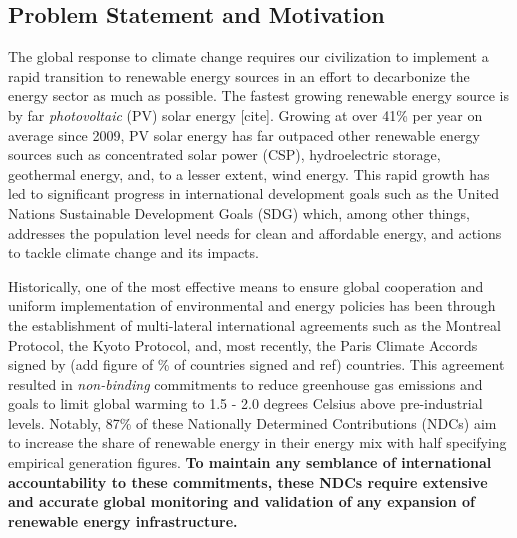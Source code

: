 \subsection{Problem Statement and Motivation} 
The global response to climate change requires our civilization to implement a rapid transition to renewable energy sources in an effort to 
decarbonize the energy sector as much as possible. The fastest growing renewable energy source is by far \textit{photovoltaic} (PV) solar energy [cite]. Growing at over 41\% per year on average since 2009\cite{kruitwagen_global_inventory_pv_units_2021},
PV solar energy has far outpaced other renewable energy sources such as concentrated solar power (CSP), hydroelectric storage, geothermal energy, and, to a lesser extent, wind energy. 
This rapid growth has led to significant progress in international development goals such as the United Nations Sustainable Development Goals (SDG) which, among other things, 
addresses the population level needs for clean and affordable energy, and actions to tackle climate change and its impacts\cite{maxar_germany_pv_dataset}. 

Historically, one of the most effective means to ensure global cooperation and uniform implementation of environmental and energy policies has been through the establishment of multi-lateral 
international agreements such as the Montreal Protocol, the Kyoto Protocol, and, most recently, the Paris Climate Accords signed by (add figure of \% of countries signed and ref) countries. 
This agreement resulted in \textit{non-binding} commitments to reduce greenhouse gas emissions and goals to limit global warming to 1.5 - 2.0 degrees Celsius above pre-industrial levels. 
Notably, 87\% of these Nationally Determined Contributions (NDCs) aim to increase the share of renewable energy in their energy mix with half specifying empirical generation figures\cite{robinson_ms_planet_global_renewables_watch_2025}. 
\textbf{To maintain any semblance of international accountability to these commitments, these NDCs require extensive and accurate global monitoring and validation of any expansion of renewable energy infrastructure.}

